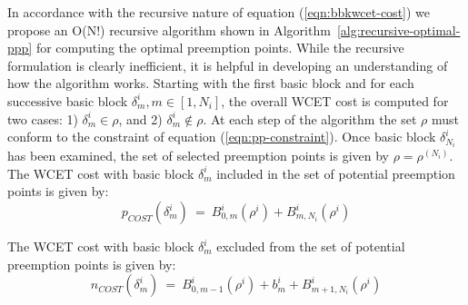 \noindent
In accordance with the recursive nature of equation (\ref{eqn:bbkwcet-cost}) we propose an O(N!) recursive algorithm shown in Algorithm~\ref{alg:recursive-optimal-ppp} for computing the optimal preemption points.  While the recursive formulation is clearly inefficient, it is helpful in developing an understanding of how the algorithm works.  Starting with the first basic block and for each successive basic block \begin{math}\delta_{m}^{i}, m \in [1,N_{i}]\end{math}, the overall WCET cost is computed for two cases: 1) \begin{math}\delta_{m}^{i} \in \rho\end{math}, and 2) \begin{math}\delta_{m}^{i} \not\in \rho\end{math}.  At each step of the algorithm the set \begin{math}\rho\end{math} must conform to the constraint of equation (\ref{eqn:pp-constraint}).  Once basic block \begin{math}\delta_{N_{i}}^{i}\end{math} has been examined, the set of selected preemption points is given by \begin{math}\rho = \rho^{(N_{i})}\end{math}.  The WCET cost with basic block \begin{math}\delta_{m}^{i}\end{math} included in the set of potential preemption points is given by:
\begin{equation}\label{eqn:pcost-bb}
p_{COST}(\delta_{m}^{i})\ =\ B_{0,m}^{i}(\rho^{i}) + B_{m,N_{i}}^{i}(\rho^{i})
\end{equation}

The WCET cost with basic block \begin{math}\delta_{m}^{i}\end{math} excluded from the set of potential preemption points is given by:
\begin{equation}\label{eqn:npcost-bb}
n_{COST}(\delta_{m}^{i})\ =\ B_{0,m-1}^{i}(\rho^{i}) + b_{m}^{i} + B_{m+1,N_{i}}^{i}(\rho^{i})
\end{equation}

